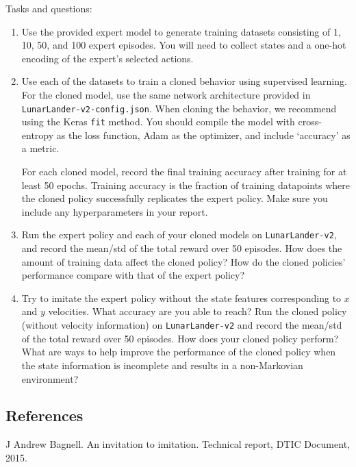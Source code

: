 \documentclass[12pt]{article}
\begin{document}
Tasks and questions:
\begin{enumerate}
\item Use the provided expert model to generate training datasets consisting of 1, 10, 50, and 100 expert episodes. You will need to collect states and a one-hot encoding of the expert's selected actions.
\item Use each of the datasets to train a cloned behavior using supervised learning. For the cloned model, use the same network architecture provided in \texttt{LunarLander-v2-config.json}. When cloning the behavior, we recommend using the Keras \texttt{fit} method. You should compile the model with cross-entropy as the loss function, Adam as the optimizer, and include `accuracy' as a metric. 

For each cloned model, record the final training accuracy after training for at least 50 epochs. Training accuracy is the fraction of training datapoints where the cloned policy successfully replicates the expert policy. Make sure you include any hyperparameters in your report. 
\begin{solution}
\end{solution}
\item Run the expert policy and each of your cloned models on \texttt{LunarLander-v2}, and record the mean/std of the total reward over 50 episodes. How does the amount of training data affect the cloned policy? How do the cloned policies' performance compare with that of the expert policy?
\begin{solution}
\end{solution}

\item Try to imitate the expert policy without the state features corresponding to $x$ and $y$ velocities.  What accuracy are you able to reach?  Run the cloned policy (without velocity information) on \texttt{LunarLander-v2} and record the mean/std of the total reward over 50 episodes. How does your cloned policy perform?  What are ways to help improve the performance of the cloned policy when the state information is incomplete and results in a non-Markovian environment?
\begin{solution}
\end{solution}
\end{enumerate}


\subsection*{References}

\noindent [1] J Andrew Bagnell. An invitation to imitation. Technical report, DTIC Document, 2015.
\end{document}
